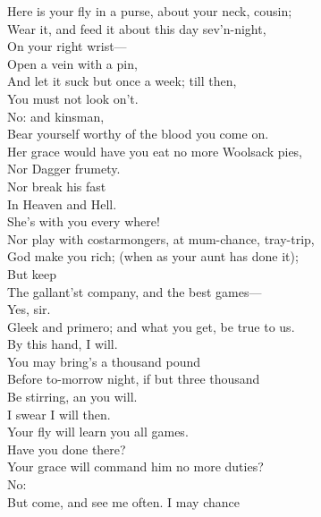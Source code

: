 \documentclass[a4paper,oneside]{memoir}
\begin{document}
\begin{drama*}
Here is your fly in a purse, about your neck, cousin;\\
Wear it, and feed it about this day sev'n-night,\\
On your right wrist---\\
\subtlespeaks {} Open a vein with a pin,\\
And let it suck but once a week; till then,\\
You must not look on't.\\
\dolspeaks {} No: and kinsman,\\
Bear yourself worthy of the blood you come on.\\
\subtlespeaks Her grace would have you eat no more Woolsack pies,\\
Nor Dagger frumety.\\
\dolspeaks {} Nor break his fast\\
In Heaven and Hell.\\
\subtlespeaks {} She's with you every where!\\
Nor play with costarmongers, at mum-chance, tray-trip,\\
God make you rich; (when as your aunt has done it);\\
But keep\\
The gallant'st company, and the best games---\\
\dapperspeaks Yes, sir.\\
\subtlespeaks {} Gleek and primero; and what you get, be true to us.\\
\dapperspeaks By this hand, I will.\\
\subtlespeaks {} You may bring's a thousand pound\\
Before to-morrow night, if but three thousand\\
Be stirring, an you will.\\
\dapperspeaks {} I swear I will then.\\
\subtlespeaks Your fly will learn you all games.\\
\facespeaks {} Have you done there?\\
\subtlespeaks {} Your grace will command him no more duties?\\
\dolspeaks No:\\
But come, and see me often. I may chance\\

\end{drama*}
\end{document}
